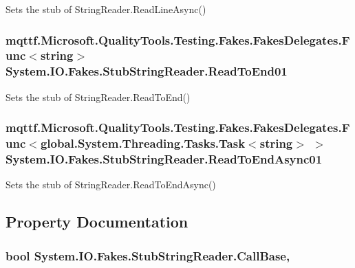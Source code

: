 Sets the stub of String\-Reader.\-Read\-Line\-Async()

\hypertarget{class_system_1_1_i_o_1_1_fakes_1_1_stub_string_reader_a72b7ce7c8b6fc7d6721b426d12f7a7bc}{
\subsubsection[{Read\-To\-End01}]{\setlength{\rightskip}{0pt plus 5cm}mqttf.\-Microsoft.\-Quality\-Tools.\-Testing.\-Fakes.\-Fakes\-Delegates.\-Func$<$string$>$ System.\-I\-O.\-Fakes.\-Stub\-String\-Reader.\-Read\-To\-End01}}\label{class_system_1_1_i_o_1_1_fakes_1_1_stub_string_reader_a72b7ce7c8b6fc7d6721b426d12f7a7bc}


Sets the stub of String\-Reader.\-Read\-To\-End()

\hypertarget{class_system_1_1_i_o_1_1_fakes_1_1_stub_string_reader_a08a04cc3cd3df9b86524fd691b34b1d7}{
\subsubsection[{Read\-To\-End\-Async01}]{\setlength{\rightskip}{0pt plus 5cm}mqttf.\-Microsoft.\-Quality\-Tools.\-Testing.\-Fakes.\-Fakes\-Delegates.\-Func$<$global.\-System.\-Threading.\-Tasks.\-Task$<$string$>$ $>$ System.\-I\-O.\-Fakes.\-Stub\-String\-Reader.\-Read\-To\-End\-Async01}}\label{class_system_1_1_i_o_1_1_fakes_1_1_stub_string_reader_a08a04cc3cd3df9b86524fd691b34b1d7}


Sets the stub of String\-Reader.\-Read\-To\-End\-Async()



\subsection{Property Documentation}
\hypertarget{class_system_1_1_i_o_1_1_fakes_1_1_stub_string_reader_a425a7c7ebf4df2a054031858aa701e60}{
\subsubsection[{Call\-Base}]{\setlength{\rightskip}{0pt plus 5cm}bool System.\-I\-O.\-Fakes.\-Stub\-String\-Reader.\-Call\-Base\hspace{0.3cm}{\ttfamily [get]}, {\ttfamily [set]}}}\label{class_system_1_1_i_o_1_1_fakes_1_1_stub_string_reader_a425a7c7ebf4df2a054031858aa701e60}


